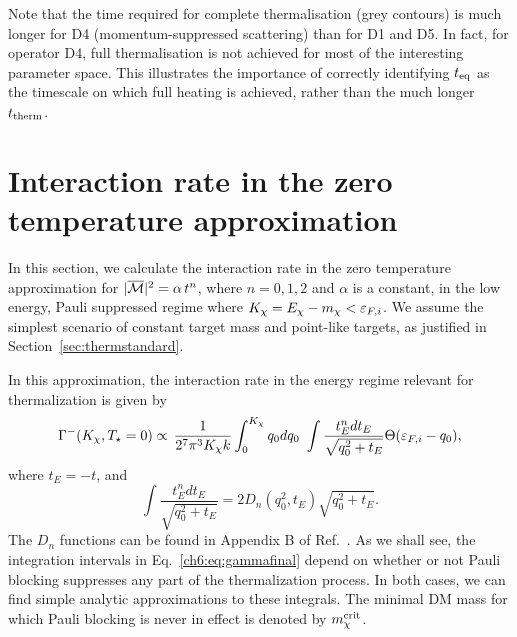 Note that the time required for complete thermalisation (grey contours) is much longer for D4 (momentum-suppressed scattering) than for D1 and D5. In fact, for operator D4, full thermalisation is not achieved for most of the interesting parameter space. This illustrates the importance of correctly identifying $t_{\rm eq}$ as the timescale on which full heating is achieved, rather than the much longer $t_{\rm therm}$. 



\section{Interaction rate in the zero temperature approximation}
\label{ch6:sec:pauliblockingle}



In this section,  we calculate the interaction rate in the zero temperature approximation for $|\overline{\mathcal M}|^2 = \alpha \, t^n$, where $n=0,1,2$ and $\alpha$ is a constant, in the low energy, Pauli suppressed regime where $K_\chi=E_\chi-m_\chi<\varepsilon_{F,i}$. 
We assume the simplest scenario of constant target mass and point-like targets, as justified in Section~\ref{sec:thermstandard}. 

In this approximation, the interaction rate in the energy regime relevant for thermalization is given by~\cite{Bell:2020jou_sep_ImprovedTreatmentDark}
\begin{equation}
\Gamma^{-}(K_\chi,T_\star=0) \propto \, \frac{1}{2^7\pi^3 K_\chi k }  \int_0^{K_\chi} q_0 dq_0 \,\, \int \frac{t_E^n dt_E }{\sqrt{q_0^2+t_E}}\Theta(\varepsilon_{F,i}-q_0),
\label{ch6:eq:gammafinal}
\end{equation}
where $t_E=-t$,   and 
\begin{equation}
\int \frac{t_E^n dt_E }{\sqrt{q_0^2+t_E}} = 2D_n(q_0^2,t_E)\sqrt{q_0^2+t_E}.
\end{equation}
The $D_n$  functions can be found in Appendix B of  Ref.~\cite{Bell:2020jou_sep_ImprovedTreatmentDark}. 
As we shall see, the integration intervals in Eq.~\ref{ch6:eq:gammafinal} depend on whether or not Pauli blocking suppresses any part of the thermalization process.
In both cases, we can find simple analytic approximations to these integrals. 
The minimal DM mass for which Pauli blocking is never in effect is denoted by $m_\chi^{\rm crit}$. 
  
